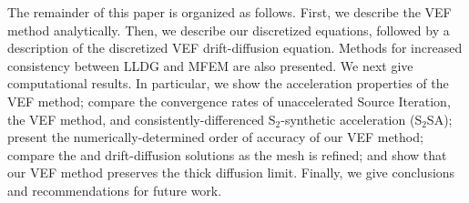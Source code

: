 The remainder of this paper is organized as follows.  First, we describe the VEF method analytically. Then, we describe 
our discretized \SN equations, followed by a description of the discretized VEF drift-diffusion equation. Methods for increased 
consistency between LLDG and MFEM are also presented. We next give computational results.  In particular, we show the acceleration properties of the VEF method; compare the convergence rates of unaccelerated Source Iteration, the VEF method, and consistently-differenced S$_2$-synthetic acceleration (S$_2$SA); present the numerically-determined order of accuracy of our VEF method; compare the \SN and drift-diffusion solutions as the mesh is refined; and show that our VEF method preserves the thick diffusion limit. Finally, we give conclusions and recommendations for future work. 

